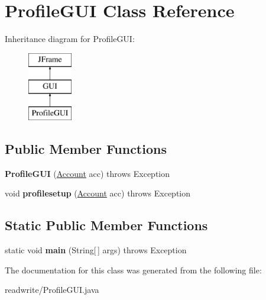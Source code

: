 \hypertarget{class_profile_g_u_i}{}\section{Profile\+G\+UI Class Reference}
\label{class_profile_g_u_i}
Inheritance diagram for Profile\+G\+UI\+:\begin{figure}[H]
\begin{center}
\leavevmode
\includegraphics[height=3.000000cm]{class_profile_g_u_i}
\end{center}
\end{figure}
\subsection*{Public Member Functions}
\begin{DoxyCompactItemize}
\item 
\mbox{\label{class_profile_g_u_i_ad1e8cf1893340cf951e96cbc5af36c1f}} 
{\bfseries Profile\+G\+UI} (\hyperlink{class_account}{Account} acc)  throws Exception 
\item 
\mbox{\label{class_profile_g_u_i_a440446d79e5c04a4734e5266d1dcdc04}} 
void {\bfseries profilesetup} (\hyperlink{class_account}{Account} acc)  throws Exception
\end{DoxyCompactItemize}
\subsection*{Static Public Member Functions}
\begin{DoxyCompactItemize}
\item 
\mbox{\label{class_profile_g_u_i_af56b9f8787202e794f33100ba8ed27df}} 
static void {\bfseries main} (String\mbox{[}$\,$\mbox{]} args)  throws Exception 
\end{DoxyCompactItemize}


The documentation for this class was generated from the following file\+:\begin{DoxyCompactItemize}
\item 
readwrite/Profile\+G\+U\+I.\+java\end{DoxyCompactItemize}
